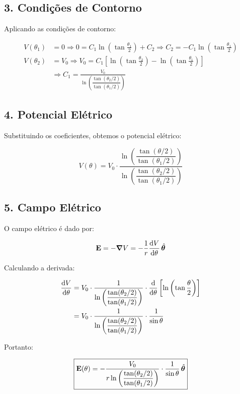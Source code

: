 \documentclass[a4paper,12pt]{article}
\begin{document}
\begin{flushleft}
\subsection*{3. Condições de Contorno}

Aplicando as condições de contorno:

\begin{align*}
V(\theta_1) &= 0 \Rightarrow 0 = C_1 \ln \left( \tan \frac{\theta_1}{2} \right) + C_2 
\Rightarrow C_2 = -C_1 \ln \left( \tan \frac{\theta_1}{2} \right) \\
V(\theta_2) &= V_0 \Rightarrow V_0 = C_1 \left[ \ln \left( \tan \frac{\theta_2}{2} \right) - \ln \left( \tan \frac{\theta_1}{2} \right) \right] \\
&\Rightarrow C_1 = \frac{V_0}{\ln \left( \dfrac{\tan(\theta_2/2)}{\tan(\theta_1/2)} \right)}
\end{align*}

\subsection*{4. Potencial Elétrico}

Substituindo os coeficientes, obtemos o potencial elétrico:

\begin{equation}
\boxed{
V(\theta) = V_0 \cdot \frac{\ln \left( \dfrac{\tan(\theta/2)}{\tan(\theta_1/2)} \right)}{\ln \left( \dfrac{\tan(\theta_2/2)}{\tan(\theta_1/2)} \right)}
}
\end{equation}

\subsection*{5. Campo Elétrico}

O campo elétrico é dado por:

\begin{equation}
\vb{E} = -\grad V = -\frac{1}{r} \dv{V}{\theta} \, \hat{\bm{\theta}}
\end{equation}

Calculando a derivada:

\begin{align*}
\dv{V}{\theta} &= V_0 \cdot \frac{1}{\ln \left( \dfrac{\tan(\theta_2/2)}{\tan(\theta_1/2)} \right)} \cdot \dv{\theta} \left[ \ln \left( \tan \frac{\theta}{2} \right) \right] \\
&= V_0 \cdot \frac{1}{\ln \left( \dfrac{\tan(\theta_2/2)}{\tan(\theta_1/2)} \right)} \cdot \frac{1}{\sin \theta}
\end{align*}

Portanto:

\begin{equation}
\boxed{
\vb{E}(\theta) = -\frac{V_0}{r \ln \left( \dfrac{\tan(\theta_2/2)}{\tan(\theta_1/2)} \right)} \cdot \frac{1}{\sin \theta} \, \hat{\bm{\theta}}
}
\end{equation}
\end{flushleft}
\end{document}
